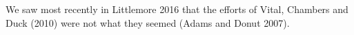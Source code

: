 We saw most recently in Littlemore 2016 that the efforts of Vital, Chambers and Duck (2010) were not what they seemed (Adams and Donut 2007).
